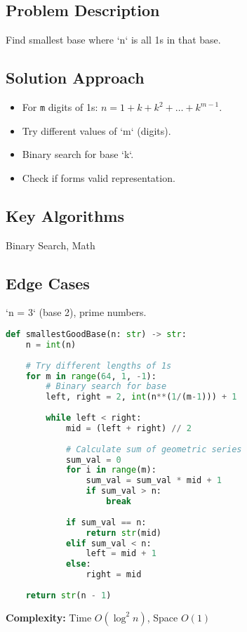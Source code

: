 \documentclass[10pt, a4paper]{article}
\begin{document}
\subsection*{Problem Description}
Find smallest base where `n` is all 1s in that base.

\subsection*{Solution Approach}
\begin{itemize}
     \item For \texttt{m} digits of 1s: $n = 1 + k + k^2 + \dots + k^{m-1}$.
    \item Try different values of `m` (digits).
    \item Binary search for base `k`.
    \item Check if forms valid representation.
\end{itemize}

\subsection*{Key Algorithms}
Binary Search, Math

\subsection*{Edge Cases}
`n = 3` (base 2), prime numbers.

\begin{lstlisting}[language=Python]
def smallestGoodBase(n: str) -> str:
    n = int(n)
    
    # Try different lengths of 1s
    for m in range(64, 1, -1):
        # Binary search for base
        left, right = 2, int(n**(1/(m-1))) + 1
        
        while left < right:
            mid = (left + right) // 2
            
            # Calculate sum of geometric series
            sum_val = 0
            for i in range(m):
                sum_val = sum_val * mid + 1
                if sum_val > n:
                    break
            
            if sum_val == n:
                return str(mid)
            elif sum_val < n:
                left = mid + 1
            else:
                right = mid
    
    return str(n - 1)
\end{lstlisting}
\textbf{Complexity:} Time $O(\log^2 n)$, Space $O(1)$
\end{document}
